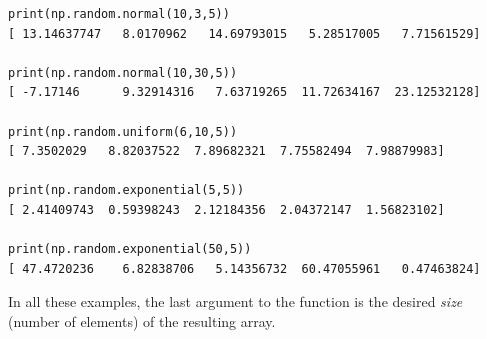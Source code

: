 \begin{Verbatim}[fontsize=\small,samepage=true,frame=single]
print(np.random.normal(10,3,5))
[ 13.14637747   8.0170962   14.69793015   5.28517005   7.71561529]

print(np.random.normal(10,30,5))
[ -7.17146      9.32914316   7.63719265  11.72634167  23.12532128]

print(np.random.uniform(6,10,5))
[ 7.3502029   8.82037522  7.89682321  7.75582494  7.98879983]

print(np.random.exponential(5,5))
[ 2.41409743  0.59398243  2.12184356  2.04372147  1.56823102]

print(np.random.exponential(50,5))
[ 47.4720236    6.82838706   5.14356732  60.47055961   0.47463824]
\end{Verbatim}

In all these examples, the last argument to the function is the desired
\textit{size} (number of elements) of the resulting array.

